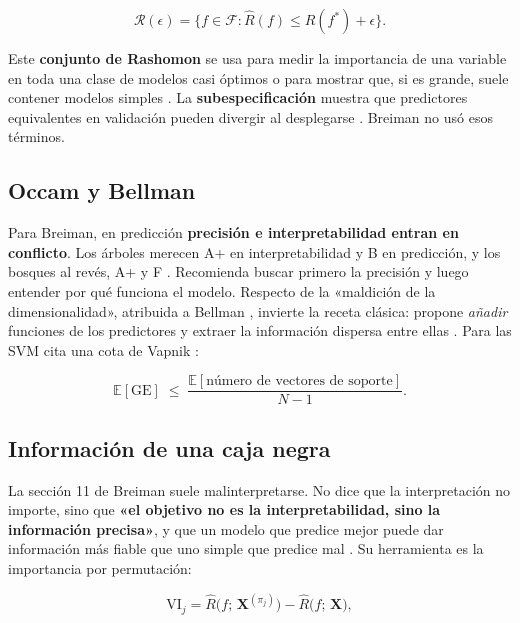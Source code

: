 \documentclass[11pt,a4paper]{article}
\begin{document}
\begin{equation}\label{eq-rashomon}
\mathcal{R}(\epsilon) = \big\{ f \in \mathcal{F} : \widehat{R}(f) \le \widehat{R}(f^{\ast}) + \epsilon \big\}.
\end{equation}

Este \textbf{conjunto de Rashomon} se usa para medir la importancia de una variable en toda una clase de modelos casi óptimos \autocite{fisher2019} o para mostrar que, si es grande, suele contener modelos simples \autocite{semenova2022}. La \textbf{subespecificación} muestra que predictores equivalentes en validación pueden divergir al desplegarse \autocite{damour2022}. Breiman no usó esos términos.

\subsection{Occam y Bellman}

Para Breiman, en predicción \textbf{precisión e interpretabilidad entran en conflicto}. Los árboles merecen A+ en interpretabilidad y B en predicción, y los bosques al revés, A+ y F \autocite[206--208]{breiman2001}. Recomienda buscar primero la precisión y luego entender por qué funciona el modelo. Respecto de la «maldición de la dimensionalidad», atribuida a Bellman \autocite{bellman1957}, invierte la receta clásica: propone \emph{añadir} funciones de los predictores y extraer la información dispersa entre ellas \autocite[208]{breiman2001}. Para las SVM cita una cota de Vapnik \autocites[209]{breiman2001}{vapnik1995}:

\begin{equation}\label{eq-vapnik}
\mathbb{E}[\text{GE}] \;\le\; \frac{\mathbb{E}[\text{número de vectores de soporte}]}{N-1}.
\end{equation}

\subsection{Información de una caja negra}

La sección 11 de Breiman suele malinterpretarse. No dice que la interpretación no importe, sino que \textbf{«el objetivo no es la interpretabilidad, sino la información precisa»}, y que un modelo que predice mejor puede dar información más fiable que uno simple que predice mal \autocite[210]{breiman2001}. Su herramienta es la importancia por permutación:

\begin{equation}\label{eq-vi}
\mathrm{VI}_j = \widehat{R}\big(f;\, \mathbf{X}^{(\pi_j)}\big) - \widehat{R}\big(f;\, \mathbf{X}\big),
\end{equation}
\end{document}
